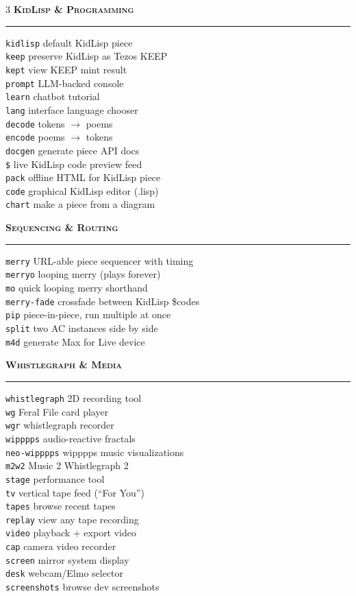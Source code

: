 \documentclass[10pt,letterpaper,twocolumn]{article}
\newcommand{\pe}[2]{\texttt{\color{acpurple}#1} #2}
\newcommand{\peh}[1]{\vspace{0.3em}\noindent\textbf{\textsc{#1}}\par\vspace{0.1em}\hrule\vspace{0.2em}}
\begin{document}
\begin{multicols}{3}
\peh{KidLisp \& Programming}
\pe{kidlisp}{default KidLisp piece}\\
\pe{keep}{preserve KidLisp as Tezos KEEP}\\
\pe{kept}{view KEEP mint result}\\
\pe{prompt}{LLM-backed console}\\
\pe{learn}{chatbot tutorial}\\
\pe{lang}{interface language chooser}\\
\pe{decode}{tokens $\rightarrow$ poems}\\
\pe{encode}{poems $\rightarrow$ tokens}\\
\pe{docgen}{generate piece API docs}\\
\pe{\$}{live KidLisp code preview feed}\\
\pe{pack}{offline HTML for KidLisp piece}\\
\pe{code}{graphical KidLisp editor (.lisp)}\\
\pe{chart}{make a piece from a diagram}

\peh{Sequencing \& Routing}
\pe{merry}{URL-able piece sequencer with timing}\\
\pe{merryo}{looping merry (plays forever)}\\
\pe{mo}{quick looping merry shorthand}\\
\pe{merry-fade}{crossfade between KidLisp \$codes}\\
\pe{pip}{piece-in-piece, run multiple at once}\\
\pe{split}{two AC instances side by side}\\
\pe{m4d}{generate Max for Live device}

\peh{Whistlegraph \& Media}
\pe{whistlegraph}{2D recording tool}\\
\pe{wg}{Feral File card player}\\
\pe{wgr}{whistlegraph recorder}\\
\pe{wipppps}{audio-reactive fractals}\\
\pe{neo-wipppps}{wipppps music visualizations}\\
\pe{m2w2}{Music 2 Whistlegraph 2}\\
\pe{stage}{performance tool}\\
\pe{tv}{vertical tape feed (``For You'')}\\
\pe{tapes}{browse recent tapes}\\
\pe{replay}{view any tape recording}\\
\pe{video}{playback + export video}\\
\pe{cap}{camera video recorder}\\
\pe{screen}{mirror system display}\\
\pe{desk}{webcam/Elmo selector}\\
\pe{screenshots}{browse dev screenshots}


\end{multicols}
\end{document}
